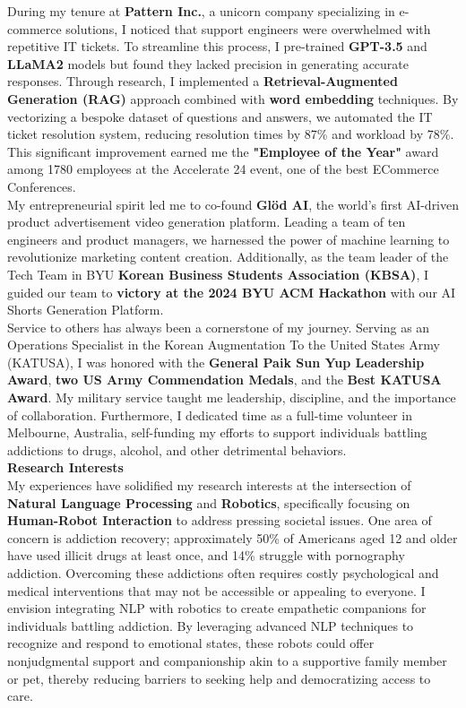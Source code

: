 \documentclass{article}
\begin{document}
During my tenure at \textbf{Pattern Inc.}, a unicorn company specializing in e-commerce solutions, I noticed that support engineers were overwhelmed with repetitive IT tickets. To streamline this process, I pre-trained \textbf{GPT-3.5} and \textbf{LLaMA2} models but found they lacked precision in generating accurate responses. Through research, I implemented a \textbf{Retrieval-Augmented Generation (RAG)} approach combined with \textbf{word embedding} techniques. By vectorizing a bespoke dataset of questions and answers, we automated the IT ticket resolution system, reducing resolution times by 87\% and workload by 78\%. This significant improvement earned me the \textbf{"Employee of the Year"} award among 1780 employees at the Accelerate 24 event, one of the best ECommerce Conferences.
\\

My entrepreneurial spirit led me to co-found \textbf{Glöd AI}, the world's first AI-driven product advertisement video generation platform. Leading a team of ten engineers and product managers, we harnessed the power of machine learning to revolutionize marketing content creation. Additionally, as the team leader of the Tech Team in BYU \textbf{Korean Business Students Association (KBSA)}, I guided our team to \textbf{victory at the 2024 BYU ACM Hackathon} with our AI Shorts Generation Platform.
\\

Service to others has always been a cornerstone of my journey. Serving as an Operations Specialist in the Korean Augmentation To the United States Army (KATUSA), I was honored with the \textbf{General Paik Sun Yup Leadership Award}, \textbf{two US Army Commendation Medals}, and the \textbf{Best KATUSA Award}. My military service taught me leadership, discipline, and the importance of collaboration. Furthermore, I dedicated time as a full-time volunteer in Melbourne, Australia, self-funding my efforts to support individuals battling addictions to drugs, alcohol, and other detrimental behaviors.
\\

\textbf{Research Interests}\\
My experiences have solidified my research interests at the intersection of \textbf{Natural Language Processing} and \textbf{Robotics}, specifically focusing on \textbf{Human-Robot Interaction}  to address pressing societal issues. One area of concern is addiction recovery; approximately 50\% of Americans aged 12 and older have used illicit drugs at least once, and 14\% struggle with pornography addiction. Overcoming these addictions often requires costly psychological and medical interventions that may not be accessible or appealing to everyone. I envision integrating NLP with robotics to create empathetic companions for individuals battling addiction. By leveraging advanced NLP techniques to recognize and respond to emotional states, these robots could offer nonjudgmental support and companionship akin to a supportive family member or pet, thereby reducing barriers to seeking help and democratizing access to care.
\\
\end{document}
